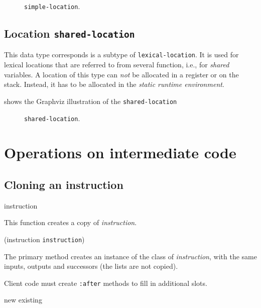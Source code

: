 \begin{figure}
\begin{center}
\end{center}
\caption{\label{fig-simple-location}
\texttt{simple-location}.}
\end{figure}

\subsection{Location \texttt{shared-location}}

This data type corresponds is a subtype of \texttt{lexical-location}.
It is used for lexical locations that are referred to from several
function, i.e., for \emph{shared} variables.  A location of this
type can \emph{not} be allocated in a register or on the stack.
Instead, it has to be allocated in the \emph{static runtime
  environment}. 

 shows the Graphviz illustration of the
\texttt{shared-location}

\begin{figure}
\begin{center}
\end{center}
\caption{\label{fig-shared-location}
\texttt{shared-location}.}
\end{figure}

\section{Operations on intermediate code}

\subsection{Cloning an instruction}

 {instruction}

This function creates a copy of \textit{instruction}.

 {(instruction {\tt instruction})}

The primary method creates an instance of the class of
\textit{instruction}, with the same inputs, outputs and successors
(the lists are not copied). 

Client code must create \texttt{:after} methods to fill in additional
slots. 

 {new existing}

